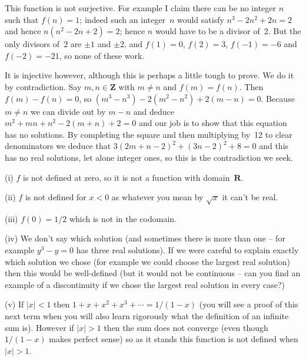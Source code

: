 \documentclass[10pt]{article}
\newcommand{\R}{\mathbf{R}}
\newcommand{\Z}{\mathbf{Z}}
\begin{document}
This function is not surjective. For example I claim there can be no integer $n$ such that $f(n)=1$; indeed such an integer~$n$ would satisfy $n^3-2n^2+2n=2$ and hence $n(n^2-2n+2)=2$; hence $n$ would have to be a divisor of~2. But the only divisors of~2 are $\pm1$ and $\pm2$, and $f(1)=0$, $f(2)=3$, $f(-1)=-6$ and $f(-2)=-21$, so none of these work.

It is injective however, although this is perhaps a little tough to prove. We do it by contradiction. Say $m,n\in\Z$ with $m\not=n$ and $f(m)=f(n)$. Then $f(m)-f(n)=0$, so $(m^3-n^3)-2(m^2-n^2)+2(m-n)=0$. Because $m\not=n$ we can divide out by $m-n$ and deduce $m^2+mn+n^2-2(m+n)+2=0$ and our job is to show that this equation has no solutions. By completing the square and then multiplying by~12 to clear denominators we deduce that $3(2m+n-2)^2+(3n-2)^2+8=0$ and this has no real solutions, let alone integer ones, so this is the contradiction we seek.

\medskip{} 

(i) $f$ is not defined at zero, so it is not a function with domain~$\R$.

(ii) $f$ is not defined for $x<0$ as whatever you mean by $\sqrt{x}$ it can't be real.

(iii) $f(0)=1/2$ which is not in the codomain.

(iv) We don't say which solution (and sometimes there is more than one -- for example $y^3-y=0$ has three real solutions). If we were careful to explain exactly which solution we chose (for example we could choose the largest real solution) then this would be well-defined (but it would not be continuous -- can you find an example of a discontinuity if we chose the largest real solution in every case?)

(v) If $|x|<1$ then $1+x+x^2+x^3+\cdots=1/(1-x)$ (you will see a proof of this next term when you will also learn rigorously what the definition of an infinite sum is). However if $|x|>1$ then the sum does not converge (even though $1/(1-x)$ makes perfect sense) so as it stands this function is not defined when $|x|>1$.
\end{document}
